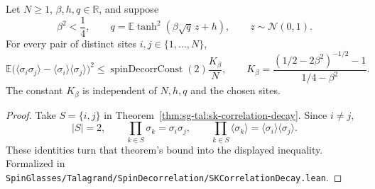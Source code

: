 \begin{theorem}\label{thm:sg-tal:gibbs-pair-covariance}
\leanok
{}
Let $N\ge1$, $\beta,h,q\in\mathbb R$, and suppose
\[
\beta^2<\frac14,\qquad q=\mathbb E\tanh^2(\beta\sqrt q\,z+h),\qquad z\sim\mathcal N(0,1).
\]
For every pair of distinct sites $i,j\in\{1,\ldots,N\}$,
\[
\mathbb E\bigl(\langle\sigma_i\sigma_j\rangle-
\langle\sigma_i\rangle\langle\sigma_j\rangle\bigr)^2
\le\operatorname{spinDecorrConst}(2)\frac{K_\beta}{N},\qquad
K_\beta=\frac{(1/2-2\beta^2)^{-1/2}-1}{1/4-\beta^2}.
\]
The constant $K_\beta$ is independent of $N,h,q$ and the chosen sites.
\end{theorem}
\begin{proof}
\leanok
Take $S=\{i,j\}$ in Theorem~\ref{thm:sg-tal:sk-correlation-decay}. Since $i\ne j$,
\[
|S|=2,\qquad \prod_{k\in S}\sigma_k=\sigma_i\sigma_j,\qquad
\prod_{k\in S}\langle\sigma_k\rangle=
\langle\sigma_i\rangle\langle\sigma_j\rangle.
\]
These identities turn that theorem's bound into the displayed inequality.
Formalized in \texttt{SpinGlasses/Talagrand/SpinDecorrelation/SKCorrelationDecay.lean}.
\end{proof}

